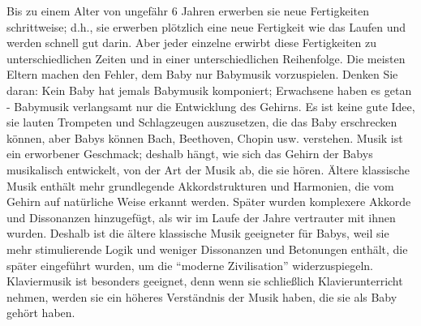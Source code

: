 Bis zu einem Alter von ungefähr 6 Jahren erwerben sie neue Fertigkeiten schrittweise; d.h., sie erwerben plötzlich eine neue Fertigkeit wie das Laufen und werden schnell gut darin.
Aber jeder einzelne erwirbt diese Fertigkeiten zu unterschiedlichen Zeiten und in einer unterschiedlichen Reihenfolge.
Die meisten Eltern machen den Fehler, dem Baby nur Babymusik vorzuspielen.
Denken Sie daran: Kein Baby hat jemals Babymusik komponiert; Erwachsene haben es getan - Babymusik verlangsamt nur die Entwicklung des Gehirns.
Es ist keine gute Idee, sie lauten Trompeten und Schlagzeugen auszusetzen, die das Baby erschrecken können, aber Babys können Bach, Beethoven, Chopin usw. verstehen.
Musik ist ein erworbener Geschmack; deshalb hängt, wie sich das Gehirn der Babys musikalisch entwickelt, von der Art der Musik ab, die sie hören.
Ältere klassische Musik enthält mehr grundlegende Akkordstrukturen und Harmonien, die vom Gehirn auf natürliche Weise erkannt werden.
Später wurden komplexere Akkorde und Dissonanzen hinzugefügt, als wir im Laufe der Jahre vertrauter mit ihnen wurden.
Deshalb ist die ältere klassische Musik geeigneter für Babys, weil sie mehr stimulierende Logik und weniger Dissonanzen und Betonungen enthält, die später eingeführt wurden, um die \enquote{moderne Zivilisation} widerzuspiegeln.
Klaviermusik ist besonders geeignet, denn wenn sie schließlich Klavierunterricht nehmen, werden sie ein höheres Verständnis der Musik haben, die sie als Baby gehört haben.


\label{c1iii18c3}

